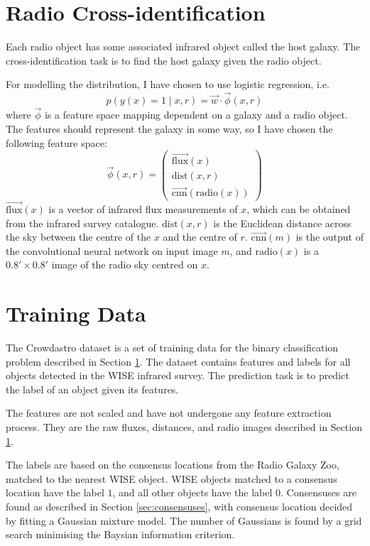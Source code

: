 \section{Radio Cross-identification}
\label{sec:cross-identification}

    Each radio object has some associated infrared object called the host
    galaxy. The cross-identification task is to find the host galaxy given the
    radio object.
    
    For modelling the distribution, I have chosen to use logistic regression,
    i.e.
    \begin{equation}
        \label{eq:logistic-regression-cross-identification}
        p(y(x) = 1 \mid x, r) = \vec w \cdot \vec \phi(x, r)
    \end{equation}
    where $\vec \phi$ is a feature space mapping dependent on a galaxy and a
    radio object. The features should represent the galaxy in some way, so I
    have chosen the following feature space:
    \begin{equation}
        \label{eq:galaxy-features}
        \vec \phi(x, r) = \begin{pmatrix}
            \vec{\mbox{flux}}(x)\\
            \mbox{dist}(x, r)\\
            \vec{\mbox{cnn}}(\mbox{radio}(x))
        \end{pmatrix}
    \end{equation}
    $\vec{\mbox{flux}}(x)$ is a vector of infrared flux measurements of $x$,
    which can be obtained from the infrared survey catalogue. $\mbox{dist}(x,
    r)$ is the Euclidean distance across the sky between the centre of the $x$
    and the centre of $r$. $\vec{\mbox{cnn}}(m)$ is the output of the
    convolutional neural network on input image $m$, and $\mbox{radio}(x)$ is a
    $0.8' \times 0.8'$ image of the radio sky centred on $x$.

\section{Training Data}
\label{sec:training-data}
  
  The Crowdastro dataset is a set of training data for the binary
  classification problem described in Section \ref{sec:cross-identification}.
  The dataset contains features and labels for all objects detected in the WISE
  infrared survey. The prediction task is to predict the label of an object
  given its features.

  The features are not scaled and have not undergone any feature extraction
  process. They are the raw fluxes, distances, and radio images described in
  Section \ref{sec:cross-identification}.

  The labels are based on the consensus locations from the Radio Galaxy Zoo,
  matched to the nearest WISE object. WISE objects matched to a consensus
  location have the label $1$, and all other objects have the label $0$.
  Consensuses are found as described in Section \ref{sec:consensuses}, with
  consensus location decided by fitting a Gaussian mixture model. The number of
  Gaussians is found by a grid search minimising the Baysian information
  criterion.

